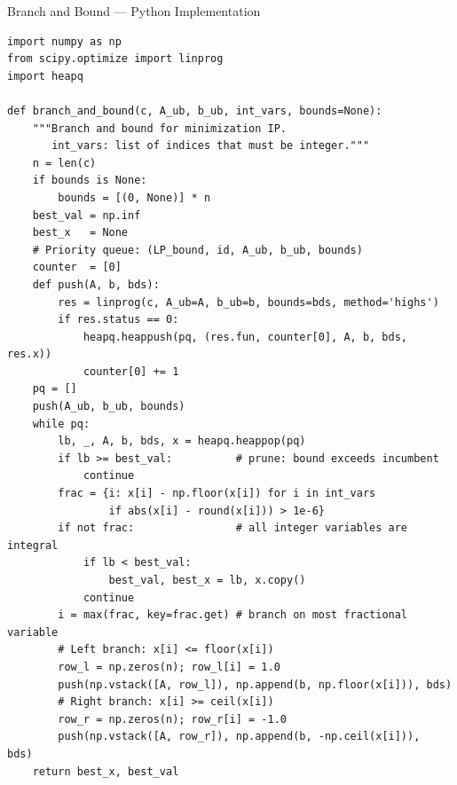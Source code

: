 \documentclass[aspectratio=169,10pt]{beamer}
\begin{document}
\begin{frame}[fragile]{Branch and Bound --- Python Implementation}
\begin{lstlisting}[style=pystyle, caption={Branch and bound for mixed-integer programs}]
import numpy as np
from scipy.optimize import linprog
import heapq

def branch_and_bound(c, A_ub, b_ub, int_vars, bounds=None):
    """Branch and bound for minimization IP.
       int_vars: list of indices that must be integer."""
    n = len(c)
    if bounds is None:
        bounds = [(0, None)] * n
    best_val = np.inf
    best_x   = None
    # Priority queue: (LP_bound, id, A_ub, b_ub, bounds)
    counter  = [0]
    def push(A, b, bds):
        res = linprog(c, A_ub=A, b_ub=b, bounds=bds, method='highs')
        if res.status == 0:
            heapq.heappush(pq, (res.fun, counter[0], A, b, bds, res.x))
            counter[0] += 1
    pq = []
    push(A_ub, b_ub, bounds)
    while pq:
        lb, _, A, b, bds, x = heapq.heappop(pq)
        if lb >= best_val:          # prune: bound exceeds incumbent
            continue
        frac = {i: x[i] - np.floor(x[i]) for i in int_vars
                if abs(x[i] - round(x[i])) > 1e-6}
        if not frac:                # all integer variables are integral
            if lb < best_val:
                best_val, best_x = lb, x.copy()
            continue
        i = max(frac, key=frac.get) # branch on most fractional variable
        # Left branch: x[i] <= floor(x[i])
        row_l = np.zeros(n); row_l[i] = 1.0
        push(np.vstack([A, row_l]), np.append(b, np.floor(x[i])), bds)
        # Right branch: x[i] >= ceil(x[i])
        row_r = np.zeros(n); row_r[i] = -1.0
        push(np.vstack([A, row_r]), np.append(b, -np.ceil(x[i])),  bds)
    return best_x, best_val
\end{lstlisting}
\end{frame}
\end{document}
